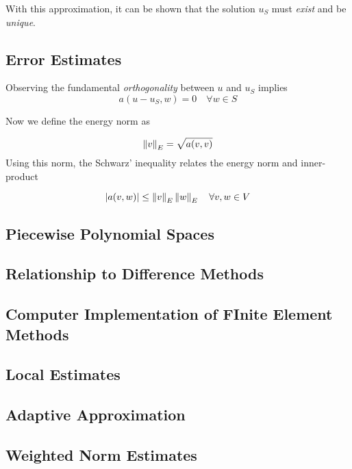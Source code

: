 \documentclass[../FEM.tex]{subfiles}
\begin{document}
With this approximation, it can be shown that the solution \(u_S\) must
\emph{exist} and be \emph{unique}.

\subsection{Error Estimates}\label{error-estimates}

Observing the fundamental \emph{orthogonality} between \(u\) and \(u_S\)
implies \[
a(u-u_S,w)=0\quad \forall w\in S
\]

Now we define the energy norm as

\[
\left\lVert v\right\rVert_E=\sqrt{a(v,v)}
\] Using this norm, the Schwarz' inequality relates the energy norm and
inner-product

\[
\left\lvert a(v,w)\right\rvert\leq \left\lVert v\right\rVert_E\left\lVert w\right\rVert_E\quad \forall v,w \in V
\]

\subsection{Piecewise Polynomial
Spaces}\label{piecewise-polynomial-spaces}

\subsection{Relationship to Difference
Methods}\label{relationship-to-difference-methods}

\subsection{Computer Implementation of FInite Element
Methods}\label{computer-implementation-of-finite-element-methods}

\subsection{Local Estimates}\label{local-estimates}

\subsection{Adaptive Approximation}\label{adaptive-approximation}

\subsection{Weighted Norm Estimates}\label{weighted-norm-estimates}
\end{document}
